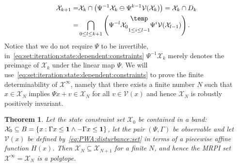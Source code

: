 \documentclass[journal]{IEEEtran}
\newcounter{thmcount}
\newtheorem{thm}[thmcount]{Theorem}
\theoremstyle{remark}
\theoremstyle{definition}
\newcommand{\bigominus}{\raisebox{10pt}{$\temp$}}
\begin{document}
%
\begin{equation}\label{eq:set:iteration:state:dependent:constraints}
\begin{split}
  \mathcal X_{k+1} =& \mathcal X_k\cap\left(\Psi^{-1}\mathcal X_k \ominus \Psi^{k-1}\mathcal V(\mathcal X_k)\right)
  =\mathcal X_k\cap D_k \\
  =& \bigcap_{0\leq l\leq k+1}\left( \Psi^{-l} \mathcal X_0 \underset{1 \leq i\leq l-1}{\bigominus} 
  \Psi^i \mathcal V(\mathcal X_{l-1})\right).
\end{split}\end{equation}
%
Notice that we do not require $\Psi$ to be invertible, in~\eqref{eq:set:iteration:state:dependent:constraints} $\Psi^{-1}\mathcal X_k$
merely denotes the preimage of $\mathcal X_k$ under the linear map $\Psi$.
We will use~\eqref{eq:set:iteration:state:dependent:constraints} to prove the finite determinability of
$\mathcal X^\infty$, namely that there exists a finite number $N$ such that $x\in\mathcal X_N$ implies
$\Psi x + v \in\mathcal X_N$ for all $v\in\mathcal V(x)$ and hence $\mathcal X_N$ is robustly positively invariant.
%
\begin{thm}\label{thm:finite:MRPI:set:state:dependable}
Let the state constraint set $\mathcal X_0$ be contained in a band: $\mathcal X_0\subseteq B=\{x:\Gamma x\leq{\bf{1}}\wedge 
-\Gamma x\leq{\bf{1}}\}$, let the pair $(\Psi,\Gamma)$ be observable and let $\mathcal V(x)$ be defined 
by~\eqref{eq:PWA:disturbance:set} in terms of a piecewise affine function $H(x)$. Then $\mathcal X_N\subseteq \mathcal 
X_{N+1}$ for a finite $N$, and hence the MRPI set $\mathcal X^\infty =\mathcal X_N$ is a polytope.
\end{thm}
%
\end{document}
